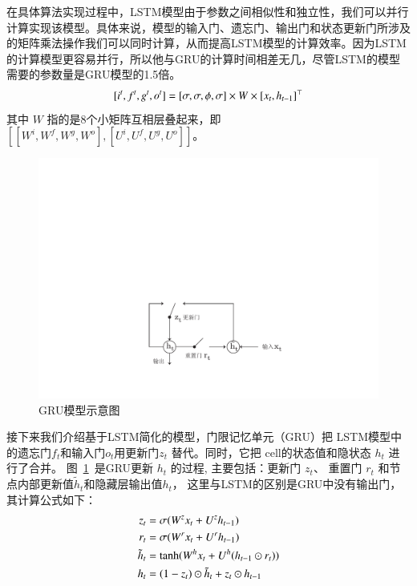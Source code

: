 在具体算法实现过程中，LSTM模型由于参数之间相似性和独立性，我们可以并行计算实现该模型。具体来说，模型的输入门、遗忘门、输出门和状态更新门所涉及的矩阵乘法操作我们可以同时计算，从而提高LSTM模型的计算效率。因为LSTM的计算模型更容易并行，所以他与GRU的计算时间相差无几，尽管LSTM的模型需要的参数量是GRU模型的1.5倍。
\begin{equation}\label{equ:weight}
\setlength{\abovedisplayskip}{6pt}
\setlength{\belowdisplayskip}{6pt}
[i^t,f^t,g^t,o^t ]=[\sigma, \sigma,\phi,\sigma]\times W\times[x_t,h_{t-1}]^\top
\end{equation}
其中 $W$ 指的是8个小矩阵互相层叠起来，即 $[[W^i,W^f,W^g,W^o],[U^i,U^f,U^g,U^o]]$。


\begin{figure}[!b]
  \centering
  \includegraphics[width=0.6\linewidth]{./figures/gru.pdf}
  \caption{GRU模型示意图}\label{fig:gru}
\end{figure}

接下来我们介绍基于LSTM简化的模型，门限记忆单元（GRU）把 LSTM模型中的遗忘门$f_t$和输入门$o_t$用更新门$z_t$ 替代。同时，它把 cell的状态值和隐状态 $h_t$ 进行了合并。 图~\ref{fig:gru}~是GRU更新 $h_t$ 的过程, 主要包括：更新门 $z_t$、 重置门 $r_t$ 和节点内部更新值$\tilde h_t$和隐藏层输出值$h_t$， 这里与LSTM的区别是GRU中没有输出门，其计算公式如下：
\begin{equation}\label{equ:gru}
\setlength{\abovedisplayskip}{6pt}
\setlength{\belowdisplayskip}{6pt}
\begin{split}
   z_t &= \sigma ( W^z x_t+ U^z h_{t-1}) \\
   r_t &= \sigma(W^r x_t  + U^r h_{t-1}  )\\
   \tilde h_t  &= \tanh (W^h x_t  + U^h(h_{t-1} \odot r_t) ) \\
   h_t &= (1-z_t)\odot \tilde h_t  + z_t \odot h_{t-1}
\end{split}
\end{equation}


